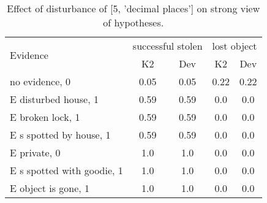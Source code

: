 \begin{table}\begin{tabular}{l|cc|cc}\toprule\multirow{2}{*}{Evidence} & \multicolumn{2}{c}{successful stolen}& \multicolumn{2}{c}{lost object}\\& {K2} & {Dev}& {K2} & {Dev}\\\midrule
no evidence, 0 & 0.05&0.05&0.22&0.22\\E disturbed house, 1 & 0.59&0.59&0.0&0.0\\E broken lock, 1 & 0.59&0.59&0.0&0.0\\E s spotted by house, 1 & 0.59&0.59&0.0&0.0\\E private, 0 & 1.0&1.0&0.0&0.0\\E s spotted with goodie, 1 & 1.0&1.0&0.0&0.0\\E object is gone, 1 & 1.0&1.0&0.0&0.0\\\bottomrule\end{tabular}\caption{Effect of disturbance of [5, 'decimal places'] on strong view of hypotheses.}\end{table}